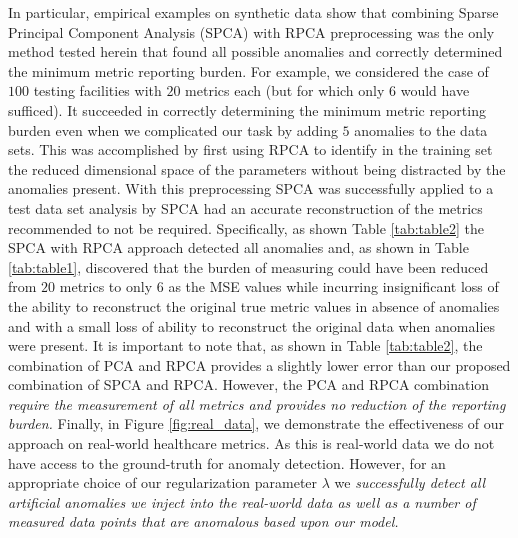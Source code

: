\documentclass[conference]{IEEEtran}
\begin{document}
In particular, empirical examples on synthetic data show that combining Sparse Principal Component Analysis (SPCA) with RPCA preprocessing was the only method tested herein that found all possible anomalies 
and correctly determined the minimum metric reporting burden. For example, we considered the case of $100$ testing facilities with $20$ metrics each (but for which only $6$ would have sufficed). It succeeded in correctly determining the minimum metric reporting burden even when we  complicated our task by adding $5$ anomalies to the  data sets.  This was accomplished by first using RPCA  to identify in the training set the reduced dimensional space of the parameters without being distracted by the anomalies present.  With this preprocessing SPCA was successfully applied to a test data set analysis by SPCA had an accurate reconstruction of the metrics recommended to not be required.  
Specifically, as shown Table \ref{tab:table2} the SPCA with RPCA approach detected all anomalies  and, as shown in Table \ref{tab:table1},  discovered that the burden of measuring could have been reduced from $20$ metrics to only $6$ as the MSE values while incurring insignificant loss of the ability to reconstruct the original true metric values in absence of anomalies and with a small loss of ability to reconstruct the original data when anomalies were present.  It is important to note that, as shown in Table \ref{tab:table2}, the combination of PCA and RPCA provides a slightly lower error than our proposed combination of SPCA and RPCA.  However, the PCA and RPCA combination \emph{require the measurement of all metrics and provides no reduction of the reporting burden.}  Finally, in  Figure \ref{fig:real_data}, we demonstrate the effectiveness of our approach on real-world healthcare metrics.   As this is real-world data we do not have access to the ground-truth for anomaly detection.  However, for an appropriate choice of our regularization parameter $\lambda$ we \emph{successfully detect all artificial anomalies we inject into the real-world data as well as a number of measured data points that are anomalous based upon our model.}
\end{document}
